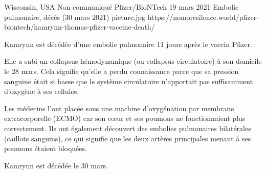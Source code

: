 {Wisconsin, USA}
{Non communiqué}
{Pfizer/BioNTech}
{19 mars 2021}
{Embolie pulmonaire, décès (30 mars 2021)}
{picture.jpg}
{https://nomoresilence.world/pfizer-biontech/kamrynn-thomas-pfizer-vaccine-death/}
{

Kamrynn est décédée d'une embolie pulmonaire 11 jours après le vaccin Pfizer.

Elle a subi un collapsus hémodynamique (ou collapsus circulatoire) à son
domicile le 28 mars. Cela signifie qu'elle a perdu connaissance parce que sa
pression sanguine était si basse que le système circulatoire n'apportait pas
suffisamment d'oxygène à ses cellules.

Les médecins l'ont placée sous une machine d'oxygénation par membrane
extracorporelle (ECMO) car son cœur et ses poumons ne fonctionnaient plus
correctement. Ils ont également découvert des embolies pulmonaires bilatérales
(caillots sanguins), ce qui signifie que les deux artères principales menant à
ses poumons étaient bloquées.

Kamrynn est décédée le 30 mars.

}
